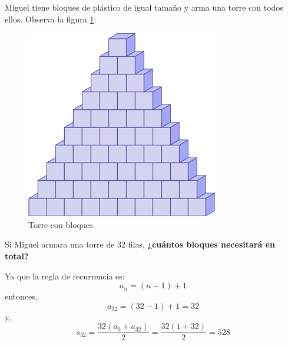 Miguel tiene bloques de plástico de igual tamaño y arma una torre con todos ellos. Observa la figura \ref{fig:22bc4d835622314209af99a305ea2515952e3902}:\\

\begin{minipage}{0.35\textwidth}
    \begin{figure}[H]
        \centering
        \includegraphics[width=0.7\linewidth]{../images/22bc4d835622314209af99a305ea2515952e3902}
        \caption{Torre con bloques.}
        \label{fig:22bc4d835622314209af99a305ea2515952e3902}
    \end{figure}
\end{minipage}\hfill
\begin{minipage}{0.6\textwidth}
    Si Miguel armara una torre de 32 filas,
    \textbf{¿cuántos bloques necesitará en total?}\\
    \begin{solutionbox}{5cm}
        Ya que la regla de recurrencia es:
        \[a_n=(n-1)+1\]
        entonces,
        \[a_{32}=(32-1)+1=32\]
        y,
        \[s_{32}=\dfrac{32(a_0+a_{32})}{2}=\dfrac{32(1+32)}{2}=528\]
    \end{solutionbox}
\end{minipage}